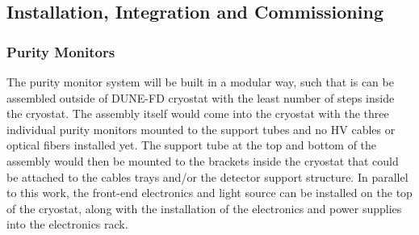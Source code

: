 




\subsection{Installation, Integration and Commissioning}


\subsubsection{Purity Monitors}
\label{sec:fdgen-slow-cryo-instal-pm}


The purity monitor system will be built in a modular way, such that is can be assembled outside of DUNE-FD cryostat  
with the least number of steps inside the cryostat.  The assembly itself would come into the cryostat with the three individual purity monitors mounted to the support tubes and no HV cables or optical fibers installed yet.  The support tube at the top and bottom of the assembly would then be mounted to the brackets inside the cryostat that could be attached to the cables trays and/or the detector support structure.  In parallel to this work, the front-end electronics and light source can be installed on the top of the cryostat, along with the installation of the electronics and power supplies into the electronics rack.  

